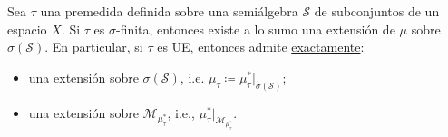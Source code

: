 \begin{theorem}
	Sea $\tau$ una premedida definida sobre una semiálgebra $\mathscr{S}$ de subconjuntos de un espacio $X$. Si $\tau$ es $\sigma$-finita, entonces existe a lo sumo una extensión de $\mu$ sobre $\sigma(\mathscr{S})$. En particular, si $\tau$ es UE, entonces admite \underline{exactamente}:
	\begin{itemize}
		\item una extensión sobre $\sigma(\mathscr{S})$, i.e. $\mu_{\tau} \coloneq \mu^{*}_{\tau}\big|_{\sigma(\mathscr{S})}$;

		\item una extensión sobre $\mathscr{M}_{\mu^{*}_{\tau}}$, i.e., $\mu^{*}_{\tau}\big|_{\mathscr{M}_{\mu^{*}_{\tau}}}$.
	\end{itemize}
\end{theorem}
